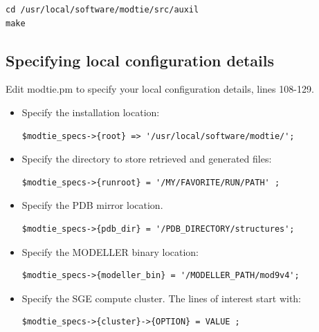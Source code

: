 \documentclass[11pt]{article}
\begin{document}
\lstset{breaklines=true,language=bash,breakatwhitespace=true}
\lstset{frame=single}
\lstset{basicstyle=\ttfamily}
\begin{lstlisting}
cd /usr/local/software/modtie/src/auxil
make
\end{lstlisting}

\subsection{Specifying local configuration details}
Edit modtie.pm to specify your local configuration details, lines 108-129.
\begin{itemize}
\item Specify the installation location:
\lstset{breaklines=true,language=bash,breakatwhitespace=true}
\lstset{frame=single}
\lstset{basicstyle=\ttfamily}
\begin{lstlisting}
$modtie_specs->{root} => '/usr/local/software/modtie/';
\end{lstlisting}

\item Specify the directory to store retrieved and generated files:
\lstset{breaklines=true,language=bash,breakatwhitespace=true}
\lstset{frame=single}
\lstset{basicstyle=\ttfamily}
\begin{lstlisting}
$modtie_specs->{runroot} = '/MY/FAVORITE/RUN/PATH' ;
\end{lstlisting}

\item Specify the PDB mirror location.
\lstset{breaklines=true,language=bash,breakatwhitespace=true}
\lstset{frame=single}
\lstset{basicstyle=\ttfamily}
\begin{lstlisting}
$modtie_specs->{pdb_dir} = '/PDB_DIRECTORY/structures';
\end{lstlisting}

\item Specify the MODELLER binary location:
\lstset{breaklines=true,language=bash,breakatwhitespace=true}
\lstset{frame=single}
\lstset{basicstyle=\ttfamily}
\begin{lstlisting}
$modtie_specs->{modeller_bin} = '/MODELLER_PATH/mod9v4';
\end{lstlisting}

\item Specify the SGE compute cluster. The lines of interest start with:
\lstset{breaklines=true,language=bash,breakatwhitespace=true}
\lstset{frame=single}
\lstset{basicstyle=\ttfamily}
\begin{lstlisting}
$modtie_specs->{cluster}->{OPTION} = VALUE ;
\end{lstlisting}


\end{itemize}
\end{document}

